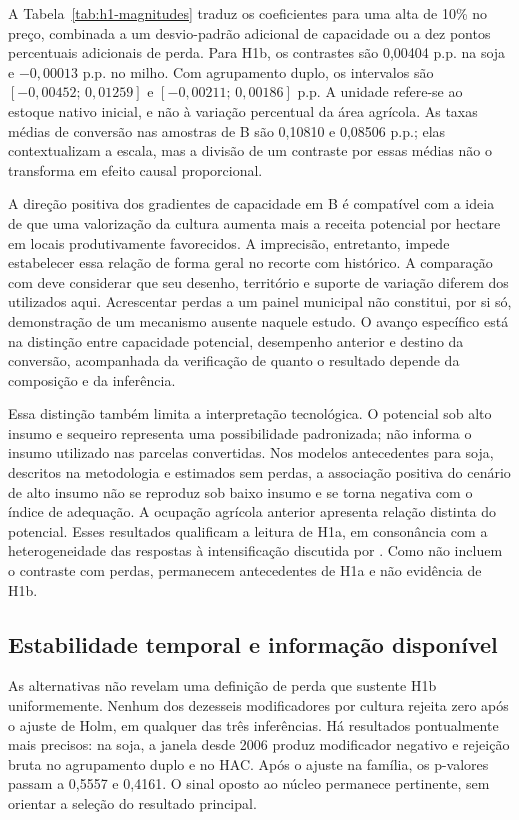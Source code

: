 


A Tabela~\ref{tab:h1-magnitudes} traduz os coeficientes para uma alta de 10\% no preço, combinada a um desvio-padrão adicional de capacidade ou a dez pontos percentuais adicionais de perda. Para H1b, os contrastes são 0,00404 p.p. na soja e $-0,00013$ p.p. no milho. Com agrupamento duplo, os intervalos são $[-0,00452;\,0,01259]$ e $[-0,00211;\,0,00186]$ p.p. A unidade refere-se ao estoque nativo inicial, e não à variação percentual da área agrícola. As taxas médias de conversão nas amostras de B são 0,10810 e 0,08506 p.p.; elas contextualizam a escala, mas a divisão de um contraste por essas médias não o transforma em efeito causal proporcional.

A direção positiva dos gradientes de capacidade em B é compatível com a ideia de que uma valorização da cultura aumenta mais a receita potencial por hectare em locais produtivamente favorecidos. A imprecisão, entretanto, impede estabelecer essa relação de forma geral no recorte com histórico. A comparação com  deve considerar que seu desenho, território e suporte de variação diferem dos utilizados aqui. Acrescentar perdas a um painel municipal não constitui, por si só, demonstração de um mecanismo ausente naquele estudo. O avanço específico está na distinção entre capacidade potencial, desempenho anterior e destino da conversão, acompanhada da verificação de quanto o resultado depende da composição e da inferência.

Essa distinção também limita a interpretação tecnológica. O potencial sob alto insumo e sequeiro representa uma possibilidade padronizada; não informa o insumo utilizado nas parcelas convertidas. Nos modelos antecedentes para soja, descritos na metodologia e estimados sem perdas, a associação positiva do cenário de alto insumo não se reproduz sob baixo insumo e se torna negativa com o índice de adequação. A ocupação agrícola anterior apresenta relação distinta do potencial. Esses resultados qualificam a leitura de H1a, em consonância com a heterogeneidade das respostas à intensificação discutida por . Como não incluem o contraste com perdas, permanecem antecedentes de H1a e não evidência de H1b.

\subsection{Estabilidade temporal e informação disponível}

As alternativas não revelam uma definição de perda que sustente H1b uniformemente. Nenhum dos dezesseis modificadores por cultura rejeita zero após o ajuste de Holm, em qualquer das três inferências. Há resultados pontualmente mais precisos: na soja, a janela desde 2006 produz modificador negativo e rejeição bruta no agrupamento duplo e no HAC. Após o ajuste na família, os p-valores passam a 0,5557 e 0,4161. O sinal oposto ao núcleo permanece pertinente, sem orientar a seleção do resultado principal.

